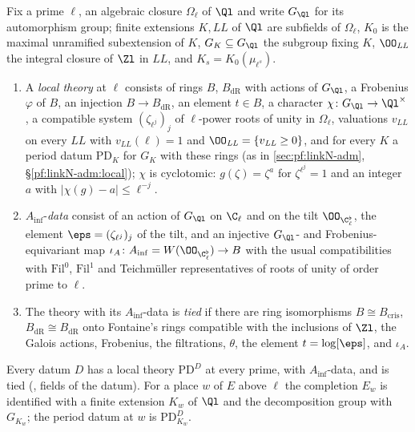\begin{definition}\label{pf:sh-hodge:def-loc}
Fix a prime $\ell$, an algebraic closure $\Omega_\ell$ of $\Ql$ and write $G_{\Ql}$ for its automorphism group; finite
extensions $K,\mathit{LL}$ of $\Ql$ are subfields of $\Omega_\ell$, $K_0$ is the maximal unramified subextension of $K$,
$G_K\subseteq G_{\Ql}$ the subgroup fixing $K$, $\OO_{\mathit{LL}}$ the integral closure of $\Zl$ in $\mathit{LL}$, and
$K_s=K_0(\mu_{\ell^s})$.
\begin{enumerate}[label=(\alph*)]
\item A \emph{local theory} at $\ell$ consists of rings $B$, $B_{\mathrm{dR}}$ with actions of $G_{\Ql}$, a Frobenius
  $\varphi$ of $B$, an injection $B\to B_{\mathrm{dR}}$, an element $t\in B$, a character $\chi\colon G_{\Ql}\to\Ql^\times$,
  a compatible system $(\zeta_{\ell^j})_j$ of $\ell$-power roots of unity in $\Omega_\ell$, valuations $v_{\mathit{LL}}$ on
  every $\mathit{LL}$ with $v_{\mathit{LL}}(\ell)=1$ and $\OO_{\mathit{LL}}=\{v_{\mathit{LL}}\ge0\}$, and for every $K$ a period datum
  $\mathrm{PD}_K$ for $G_K$ with these rings (as in \cref{sec:pf:linkN-adm}, \S\ref{pf:linkN-adm:local}); $\chi$ is
  cyclotomic: $g(\zeta)=\zeta^a$ for $\zeta^{\ell^j}=1$ and an integer $a$ with $|\chi(g)-a|\le\ell^{-j}$.
\item $A_{\inf}$-\emph{data} consist of an action of $G_{\Ql}$ on $\C_\ell$ and on the tilt $\OO_{\C_\ell^\flat}$, the element
  $\eps=(\zeta_{\ell^j})_j$ of the tilt, and an injective $G_{\Ql}$- and Frobenius-equivariant map
  $\iota_A\colon A_{\inf}=W(\OO_{\C_\ell^\flat})\to B$ with the usual compatibilities with $\mathrm{Fil}^0$, $\mathrm{Fil}^1$ and
  Teichm\"uller representatives of roots of unity of order prime to $\ell$.
\item The theory with its $A_{\inf}$-data is \emph{tied} if there are ring isomorphisms $B\cong B_{\mathrm{cris}}$,
  $B_{\mathrm{dR}}\cong B_{\mathrm{dR}}$ onto Fontaine's rings \cite{Fontaine1982,Fontaine1994} compatible with the inclusions
  of $\Zl$, the Galois actions, Frobenius, the filtrations, $\theta$, the element $t=\log[\eps]$, and $\iota_A$.
\end{enumerate}
Every datum $D$ has a local theory $\mathrm{PD}^D$ at every prime, with $A_{\inf}$-data, and is tied
(\cite{LeanSource2026}, fields of the datum). For a place $w$ of $E$ above $\ell$ the completion $E_w$ is identified with a
finite extension $K_w$ of $\Ql$ and the decomposition group with $G_{K_w}$; the period datum at $w$ is $\mathrm{PD}^D_{K_w}$.
\end{definition}

